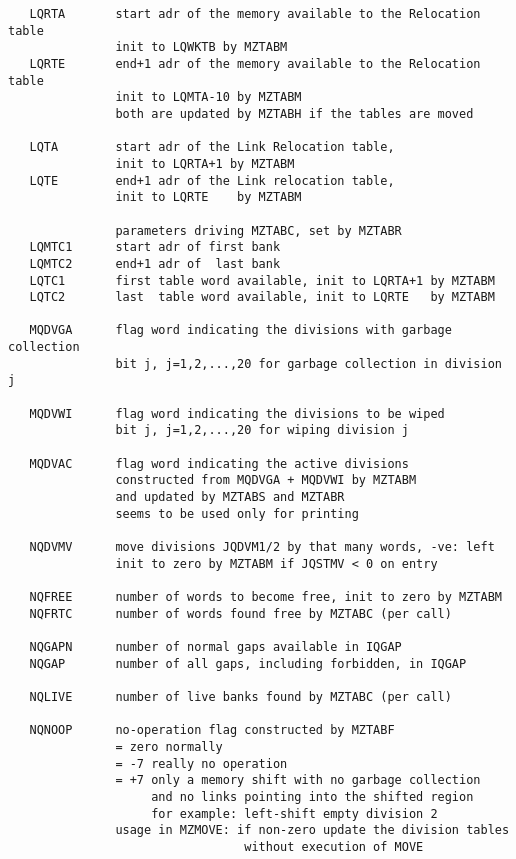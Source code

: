 \begin{verbatim}
   LQRTA       start adr of the memory available to the Relocation table
               init to LQWKTB by MZTABM
   LQRTE       end+1 adr of the memory available to the Relocation table
               init to LQMTA-10 by MZTABM
               both are updated by MZTABH if the tables are moved

   LQTA        start adr of the Link Relocation table,
               init to LQRTA+1 by MZTABM
   LQTE        end+1 adr of the Link relocation table,
               init to LQRTE    by MZTABM

               parameters driving MZTABC, set by MZTABR
   LQMTC1      start adr of first bank
   LQMTC2      end+1 adr of  last bank
   LQTC1       first table word available, init to LQRTA+1 by MZTABM
   LQTC2       last  table word available, init to LQRTE   by MZTABM

   MQDVGA      flag word indicating the divisions with garbage collection
               bit j, j=1,2,...,20 for garbage collection in division j

   MQDVWI      flag word indicating the divisions to be wiped
               bit j, j=1,2,...,20 for wiping division j

   MQDVAC      flag word indicating the active divisions
               constructed from MQDVGA + MQDVWI by MZTABM
               and updated by MZTABS and MZTABR
               seems to be used only for printing

   NQDVMV      move divisions JQDVM1/2 by that many words, -ve: left
               init to zero by MZTABM if JQSTMV < 0 on entry

   NQFREE      number of words to become free, init to zero by MZTABM
   NQFRTC      number of words found free by MZTABC (per call)

   NQGAPN      number of normal gaps available in IQGAP
   NQGAP       number of all gaps, including forbidden, in IQGAP

   NQLIVE      number of live banks found by MZTABC (per call)

   NQNOOP      no-operation flag constructed by MZTABF
               = zero normally
               = -7 really no operation
               = +7 only a memory shift with no garbage collection
                    and no links pointing into the shifted region
                    for example: left-shift empty division 2
               usage in MZMOVE: if non-zero update the division tables
                                 without execution of MOVE
\end{verbatim} 

